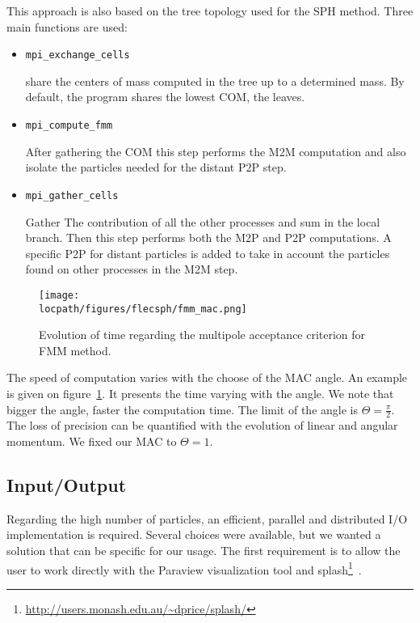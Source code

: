 This approach is also based on the tree topology used for the SPH method. 
Three main functions are used: 
\begin{itemize}
	\item \begin{verbatim}mpi_exchange_cells\end{verbatim} share the centers of mass computed in the tree up to a determined mass. By default, the program shares the lowest COM, the leaves. 
	\item \begin{verbatim}mpi_compute_fmm\end{verbatim} After gathering the COM this step performs the M2M computation and also isolate the particles needed for the distant P2P step. 
	\item \begin{verbatim}mpi_gather_cells\end{verbatim} Gather The contribution of all the other processes and sum in the local branch.
	Then this step performs both the M2P and P2P computations. 
	A specific P2P for distant particles is added to take in account the particles found on other processes in the M2M step.
\end{itemize}

\begin{figure}[t!]
\centering
\texttt{[image: \\locpath/figures/flecsph/fmm\_mac.png]}
\caption[Search for optimal MAC criterion]{Evolution of time regarding the multipole acceptance criterion for FMM method.}
\label{fig:mac_angle}
\end{figure}

The speed of computation varies with the choose of the MAC angle. 
An example is given on figure~\ref{fig:mac_angle}.
It presents the time varying with the angle. 
We note that bigger the angle, faster the computation time. 
The limit of the angle is $\Theta =  \frac{\pi}{2}$.
The loss of precision can be quantified with the evolution of linear and angular momentum.
We fixed our MAC to $\Theta = 1$.

\subsection{Input/Output}
Regarding the high number of particles, an efficient, parallel and distributed I/O implementation is required. 
Several choices were available, but we wanted a solution that can be specific for our usage. 
The first requirement is to allow the user to work directly with the Paraview visualization tool and splash\footnote{\url{http://users.monash.edu.au/~dprice/splash/}}~\cite{price2007splash}.

